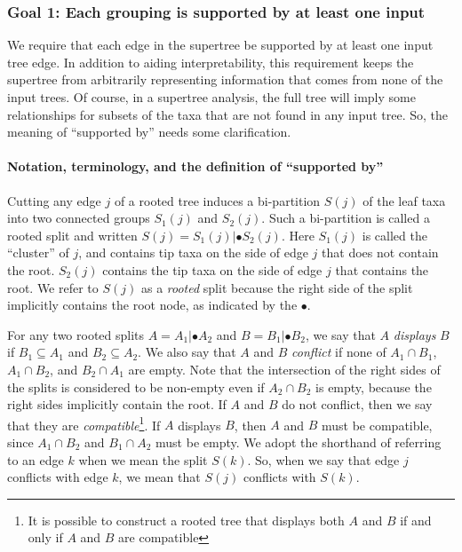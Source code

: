 \documentclass[fleqn,12pt,lineno,english]{wlpeerj}
\begin{document}
\subsubsection{Goal 1: Each grouping is supported by at least one input}

We require that each edge in the supertree be supported by at least
one input tree edge. In addition to aiding interpretability, this
requirement keeps the supertree from arbitrarily representing information
that comes from none of the input trees. Of course, in a supertree
analysis, the full tree will imply some relationships for subsets
of the taxa that are not found in any input tree. So, the meaning
of ``supported by'' needs some clarification. 

\paragraph*{Notation, terminology, and the definition of ``supported by''}

Cutting any edge $j$ of a rooted tree induces a bi-partition
$S(j)$ of the leaf taxa into two connected groups $S_{1}(j)$ and
$S_{2}(j)$. Such a bi-partition is called a rooted split and written
$S(j)=S_{1}(j)|\bullet S_{2}(j)$. Here $S_{1}(j)$ is called the ``cluster'' of $j$, and contains tip taxa on the side of edge $j$ that does not contain the
root. $S_{2}(j)$ contains the tip taxa on the side of edge $j$ that
contains the root. We refer to $S(j)$ as a \emph{rooted} split because
the right side of the split implicitly contains the root node, as indicated
by the $\bullet$.

For any two rooted splits $A=A_{1}|\bullet A_{2}$ and $B=B_{1}|\bullet B_{2}$,
we say that $A$ \emph{displays} $B$ if $B_{1}\subseteq A_{1}$ and
$B_{2}\subseteq A_{2}$. We also say that $A$ and $B$ \emph{conflict}
if none of $A_{1}\cap B_{1}$, $A_{1}\cap B_{2}$, and $B_{2}\cap A_{1}$
are empty.
Note that the intersection of the right sides of the splits is considered to
be non-empty even if $A_{2}\cap B_{2}$ is empty, because the right
sides implicitly contain the root. If $A$ and $B$ do not conflict, then we say that they are \emph{compatible}\footnote{It is possible to construct a rooted tree that displays both $A$
and $B$ if and only if $A$ and $B$ are compatible}. If $A$ displays $B$, then $A$ and $B$ must be compatible, since
$A_{1}\cap B_{2}$ and $B_{1}\cap A_{2}$ must be empty. We adopt
the shorthand of referring to an edge $k$ when we mean the split
$S(k)$. So, when we say that edge $j$ conflicts with edge $k$,
we mean that $S(j)$ conflicts with $S(k)$. 
\end{document}
